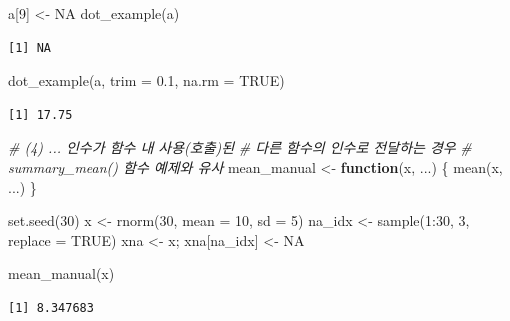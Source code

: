 \documentclass[
  11pt,
]{krantz}
\newenvironment{Shaded}{\begin{snugshade}}{\end{snugshade}}
\newcommand{\AttributeTok}[1]{\textcolor[rgb]{0.61,0.61,0.61}{#1}}
\newcommand{\CommentTok}[1]{\textcolor[rgb]{0.37,0.37,0.37}{\textit{#1}}}
\newcommand{\ConstantTok}[1]{\textcolor[rgb]{0,0,0}{#1}}
\newcommand{\ControlFlowTok}[1]{\textcolor[rgb]{0.27,0.27,0.27}{\textbf{#1}}}
\newcommand{\DecValTok}[1]{\textcolor[rgb]{0.06,0.06,0.06}{#1}}
\newcommand{\FloatTok}[1]{\textcolor[rgb]{0.06,0.06,0.06}{#1}}
\newcommand{\FunctionTok}[1]{\textcolor[rgb]{0,0,0}{#1}}
\newcommand{\NormalTok}[1]{#1}
\newcommand{\OtherTok}[1]{\textcolor[rgb]{0.37,0.37,0.37}{#1}}
\newcommand{\SpecialCharTok}[1]{\textcolor[rgb]{0,0,0}{#1}}
\begin{document}
\begin{Shaded}
\begin{Highlighting}[]
\NormalTok{a[}\DecValTok{9}\NormalTok{] }\OtherTok{\textless{}{-}} \ConstantTok{NA}
\FunctionTok{dot\_example}\NormalTok{(a)}
\end{Highlighting}
\end{Shaded}

\begin{verbatim}
[1] NA
\end{verbatim}

\begin{Shaded}
\begin{Highlighting}[]
\FunctionTok{dot\_example}\NormalTok{(a, }\AttributeTok{trim =} \FloatTok{0.1}\NormalTok{, }\AttributeTok{na.rm =} \ConstantTok{TRUE}\NormalTok{)}
\end{Highlighting}
\end{Shaded}

\begin{verbatim}
[1] 17.75
\end{verbatim}

\normalsize

\footnotesize

\begin{Shaded}
\begin{Highlighting}[]
\CommentTok{\# (4) \textasciigrave{}...\textasciigrave{} 인수가 함수 내 사용(호출)된 }
\CommentTok{\# 다른 함수의 인수로 전달하는 경우}
\CommentTok{\# summary\_mean() 함수 예제와 유사}
\NormalTok{mean\_manual }\OtherTok{\textless{}{-}} \ControlFlowTok{function}\NormalTok{(x, ...) \{}
  \FunctionTok{mean}\NormalTok{(x, ...)}
\NormalTok{\}}

\FunctionTok{set.seed}\NormalTok{(}\DecValTok{30}\NormalTok{)}
\NormalTok{x }\OtherTok{\textless{}{-}} \FunctionTok{rnorm}\NormalTok{(}\DecValTok{30}\NormalTok{, }\AttributeTok{mean =} \DecValTok{10}\NormalTok{, }\AttributeTok{sd =} \DecValTok{5}\NormalTok{)}
\NormalTok{na\_idx }\OtherTok{\textless{}{-}} \FunctionTok{sample}\NormalTok{(}\DecValTok{1}\SpecialCharTok{:}\DecValTok{30}\NormalTok{, }\DecValTok{3}\NormalTok{, }\AttributeTok{replace =} \ConstantTok{TRUE}\NormalTok{)}
\NormalTok{xna }\OtherTok{\textless{}{-}}\NormalTok{ x; xna[na\_idx] }\OtherTok{\textless{}{-}} \ConstantTok{NA}

\FunctionTok{mean\_manual}\NormalTok{(x)}
\end{Highlighting}
\end{Shaded}

\begin{verbatim}
[1] 8.347683
\end{verbatim}
\end{document}
